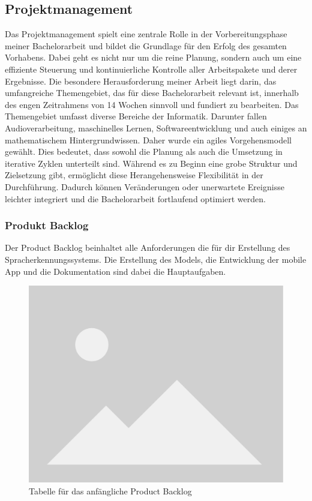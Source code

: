 \documentclass[main.tex]{subfiles} %
\begin{document}
\subsection{Projektmanagement}
Das Projektmanagement spielt eine zentrale Rolle in der Vorbereitungsphase meiner Bachelorarbeit 
und bildet die Grundlage für den Erfolg des gesamten Vorhabens. Dabei geht es nicht nur um die 
reine Planung, sondern auch um eine effiziente Steuerung und kontinuierliche Kontrolle aller 
Arbeitspakete und derer Ergebnisse. Die besondere Herausforderung meiner Arbeit liegt darin, 
das umfangreiche Themengebiet, das für diese Bachelorarbeit relevant ist, innerhalb des engen 
Zeitrahmens von 14 Wochen sinnvoll und fundiert zu bearbeiten. Das Themengebiet umfasst diverse 
Bereiche der Informatik. Darunter fallen Audioverarbeitung, maschinelles Lernen, 
Softwareentwicklung und auch einiges an mathematischem Hintergrundwissen. Daher wurde ein agiles 
Vorgehensmodell gewählt. Dies bedeutet, dass sowohl die Planung als auch die Umsetzung in iterative 
Zyklen unterteilt sind. Während es zu Beginn eine grobe Struktur und Zielsetzung gibt, ermöglicht 
diese Herangehensweise Flexibilität in der Durchführung. Dadurch können Veränderungen oder 
unerwartete Ereignisse leichter integriert und die Bachelorarbeit fortlaufend optimiert werden.

\subsubsection{Produkt Backlog}

Der Product Backlog beinhaltet alle Anforderungen die für dir Erstellung des 
Spracherkennungssystems. Die Erstellung des Models, die Entwicklung der 
mobile App und die Dokumentation sind dabei die Hauptaufgaben.



\begin{figure}[h]
    \centering
    \includegraphics[width=0.4\linewidth]{img/placeholder.png}
    \caption{Tabelle für das anfängliche Product Backlog}
    \label{fig:backlog_table}
\end{figure}
\end{document}
